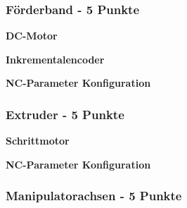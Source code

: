 \subsubsection{Förderband - 5 Punkte}

\textbf{DC-Motor}


\textbf{Inkrementalencoder}


\textbf{NC-Parameter Konfiguration}

\subsubsection{Extruder - 5 Punkte}

\textbf{Schrittmotor}

\textbf{NC-Parameter Konfiguration}

\subsubsection{Manipulatorachsen - 5 Punkte}

\newpage
